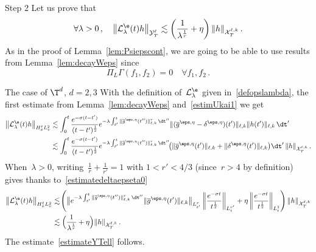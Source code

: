 \begin{step}{Step 2}%
Let us prove that
\begin{equation}\label{estimateYTell}
\forall \lambda >0 \,, \quad \big \| \mathcal{L}_\lambda^{\e}(t) h\big\|_{\mathcal{Y}^\ell_T}
\lesssim\left(\frac{1}{\lambda^\frac1r} + \eta \right)\| h \|_{\mathcal{X}_T^{\ell,k}}\,.
\end{equation}
As in the proof of Lemma~\ref{lem:Psiepscont}, we are going to be able to use results from Lemma~\ref{lem:decayWeps} since
\[
\Pi_{L} \Gamma(f_1,f_2) = 0 \quad \forall f_1,f_2 \,.
\]

\begin{step}{The case of $\T^d$, $d = 2,3$}
With the definition of~$ \mathcal{L}_\lambda^{\e}$ given in~\eqref{defopslambda}, the first estimate from Lemma~\ref{lem:decayWeps} and~\eqref{estimUkai1} we get
\begin{align*}
\big \| \mathcal{L}_\lambda^{\e}(t) h\big\|_{H^\ell_xL^2_v} & \lesssim \int_0^t \frac{e^{-\sigma(t-t')}}{(t-t')^\frac12} e^{- \lambda \int_{t'}^t \|\overline g^{\eps,\eta}(t'')\|_{\ell,k}^r\, \dt''}
\|(\overline g^{\eps,\eta}-\delta^{\eps,\eta})(t')\|_{\ell,k}\|h(t')\|_{\ell,k} \, \dt'\\
& \lesssim \int_0^t \frac{e^{-\sigma(t-t')}}{(t-t')^\frac12} e^{- \lambda \int_{t'}^t \|\overline g^{\eps,\eta}(t'')\|_{\ell,k}^r\, \dt''}\!\!\left(\|\overline g^{\eps,\eta}(t')\|_{\ell,k} + \|\delta^{\eps,\eta}(t')\|_{\ell,k}\right)\! \dt' \, \|h\|_{\mathcal{X}_T^{\ell,k}} \,.
\end{align*}
When~$\lambda >0$, writing~$\frac1r+\frac1{r'} = 1$ with $1<r'<4/3$ (since~$r>4$ by definition) gives thanks to~\eqref{estimatedeltaepseta0}
\begin{align*}
\big \| \mathcal{L}_\lambda^{\e}(t) h\big\|_{H^\ell_xL^2_v} &\lesssim\!\left(\big\| e^{- \lambda \int_{t'}^t \|\overline g^{\eps,\eta}(t'')\|_{\ell,k}^r\, \dt'' } \|\overline g^{\eps,\eta}(t')\|_{\ell,k} \big\|_{L^r_{t'}} \left\|\frac{e^{-\sigma t}}{t^\frac12}\right\|_{L^{r'}_{t}} + \eta \left\|\frac{e^{-\sigma t}}{t^\frac12}\right\|_{L^{1}_{t}}\right)
\| h \|_{\mathcal{X}_T^{\ell,k}}\\
& \lesssim \Big(\frac{1}{\lambda^\frac1r}+ \eta\Big) \| h \|_{\mathcal{X}_T^{\ell,k}}\,.
\end{align*}
The estimate~\eqref{estimateYTell} follows.
\end{step}



\end{step}
